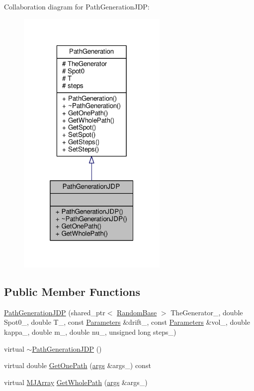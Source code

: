Collaboration diagram for Path\+Generation\+J\+DP\+:
\nopagebreak
\begin{figure}[H]
\begin{center}
\leavevmode
\includegraphics[width=205pt]{classPathGenerationJDP__coll__graph}
\end{center}
\end{figure}
\subsection*{Public Member Functions}
\begin{DoxyCompactItemize}
\item 
\hyperlink{classPathGenerationJDP_a156a05885d03359d4487f15888378f1d}{Path\+Generation\+J\+DP} (shared\+\_\+ptr$<$ \hyperlink{classRandomBase}{Random\+Base} $>$ The\+Generator\+\_\+, double Spot0\+\_\+, double T\+\_\+, const \hyperlink{classParameters}{Parameters} \&drift\+\_\+, const \hyperlink{classParameters}{Parameters} \&vol\+\_\+, double kappa\+\_\+, double m\+\_\+, double nu\+\_\+, unsigned long steps\+\_\+)
\item 
virtual \hyperlink{classPathGenerationJDP_a2820c450810a38be8de022f7bc84a110}{$\sim$\+Path\+Generation\+J\+DP} ()
\item 
virtual double \hyperlink{classPathGenerationJDP_ad30abaeb2b4793a5fde77e9ce77e8691}{Get\+One\+Path} (\hyperlink{path__generation_8h_a75c13cde2074f502cc4348c70528572d}{args} \&args\+\_\+) const
\item 
virtual \hyperlink{classMJArray}{M\+J\+Array} \hyperlink{classPathGenerationJDP_a6bd084a32f7ad0a65039f1e77c1d428e}{Get\+Whole\+Path} (\hyperlink{path__generation_8h_a75c13cde2074f502cc4348c70528572d}{args} \&args\+\_\+)
\end{DoxyCompactItemize}
